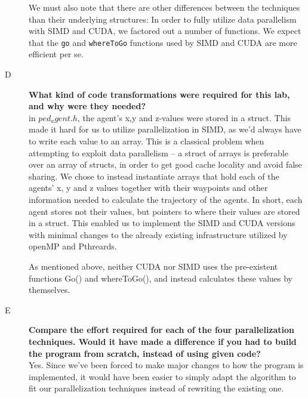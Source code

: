 \documentclass[a4paper,11pt]{article}
\begin{document}
\begin{description}
We must also note that there are other differences between the techniques than their underlying structures: In order to fully utilize data parallelism with SIMD and CUDA, we factored out a number of functions. We expect that the \texttt{go} and \texttt{whereToGo} functions used by SIMD and CUDA are more efficient per se.

    \item[D] \textbf{What kind of code transformations were required for this lab, and why were they
needed?} \hfill \\in $ped_agent.h$, the agent's x,y and z-values were stored in a struct. This made it hard for us to utilize parallelization in SIMD, as we'd always have to write each value to an array. This is a classical problem when attempting to exploit data parallelism -- a struct of arrays is preferable over an array of structs, in order to get good cache locality and avoid false sharing. We chose to instead instantiate arrays that hold each of the agents' x, y and z values together with their waypoints and other information needed to calculate the trajectory of the agents. In short, each agent stores not their values, but pointers to where their values are stored in a struct. This enabled us to implement the SIMD and CUDA versions with minimal changes to the already existing infrastructure utilized by openMP and Pthreards.

As mentioned above, neither CUDA nor SIMD uses the pre-existent functions Go() and whereToGo(), and instead calculates these values by themselves.

    \item[E] \textbf{Compare the effort required for each of the four parallelization techniques. Would
it have made a difference if you had to build the program from scratch, instead
of using given code?} \hfill \\ Yes. Since we've been forced to make major changes to how the program is implemented, it would have been easier to simply adapt the algorithm to fit our parallelization techniques instead of rewriting the existing one. 
\end{description}
\end{document}
